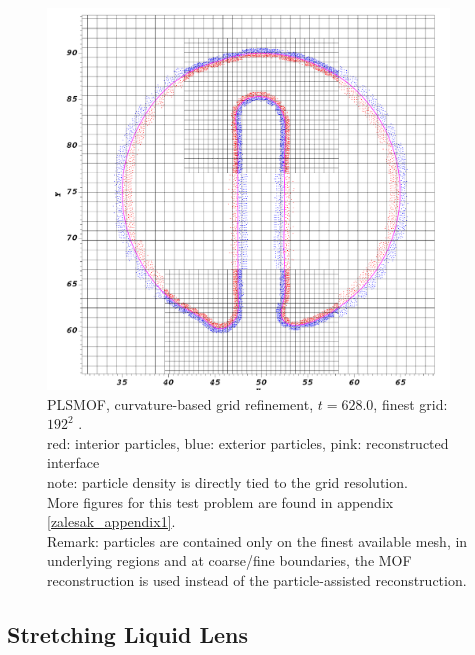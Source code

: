 \documentclass[preprint,12pt]{Definitions/elsarticle}
\begin{document}
\begin{figure}[htbp]
	\centering
	\includegraphics[width=0.95\textwidth]{zalesak/zalesak_t628_curvaturerefined.PNG}
	\caption{PLSMOF, curvature-based grid refinement, $t=628.0$, finest grid: $192^{2}$ . \\ 
		red: interior particles, blue: exterior particles, pink: reconstructed interface\\
		note: particle density is directly tied to the grid resolution.\\ More figures for this test problem are found in appendix \ref{zalesak_appendix1}.\\ Remark: particles are contained only on the finest available mesh, in underlying regions and at coarse/fine boundaries, the MOF reconstruction is used instead of the particle-assisted reconstruction.
	}
	\label{zalesak_compare2}
\end{figure}



\FloatBarrier
\subsection{Stretching Liquid Lens}
\end{document}
